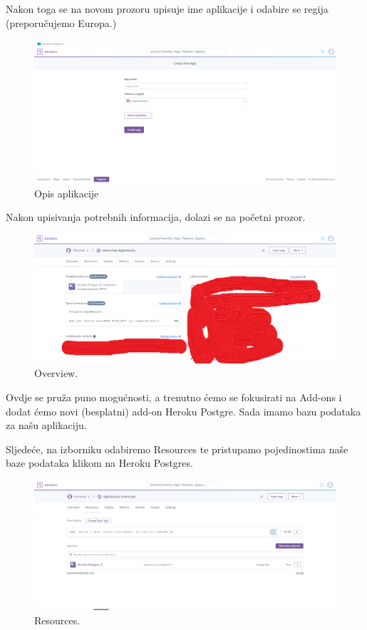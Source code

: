 			 Nakon toga se na novom prozoru upisuje ime aplikacije i odabire se regija (preporučujemo Europa.)
			 
			 \begin{figure}[H]
			 	\includegraphics[scale=0.4]{slike/opis aplikacije.png} 
			 	\centering
			 	\caption{Opis aplikacije}
			 	\label{OPAPP}
			 \end{figure} 
			 
			 Nakon upisivanja potrebnih informacija, dolazi se na početni prozor.
			 \begin{figure}[H]
			 	\includegraphics[scale=0.3]{slike/Overview.png} 
			 	\centering
			 	\caption{ Overview.}
			 	\label{OV}
			 \end{figure}
			 
			 Ovdje se pruža puno mogućnosti, a trenutno ćemo se fokusirati na Add-ons i dodat ćemo novi (besplatni) add-on Heroku Postgre. Sada imamo bazu podataka za našu aplikaciju.
			 
			 Sljedeće, na izborniku odabiremo Resources te pristupamo pojedinostima naše baze podataka klikom na Heroku Postgres.
			 
			 \begin{figure}[H]
			 	\includegraphics[scale=0.4]{slike/Resources.png} 
			 	\centering
			 	\caption{ Resources.}
			 	\label{RSC}
			 \end{figure}
		 
